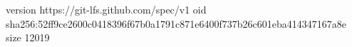 version https://git-lfs.github.com/spec/v1
oid sha256:52ff9ce2600c0418396f67b0a1791c871e6400f737b26c601eba414347167a8e
size 12019
